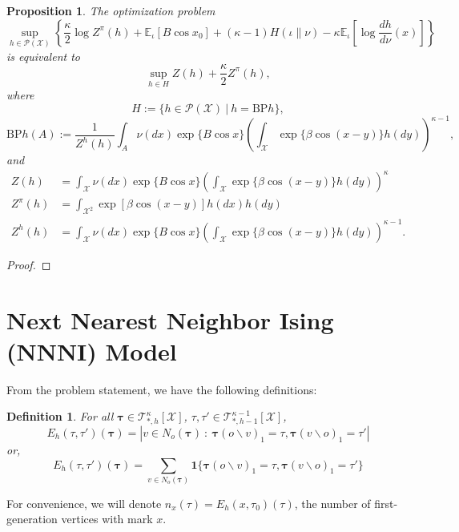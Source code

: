\documentclass[12pt]{article}
\newtheorem{proposition}[theorem]{Proposition}
\newtheorem{definition}[theorem]{Definition}
\newcommand{\TB}{{ \boldsymbol\tau}}
\numberwithin{equation}{section}
\begin{document}
\begin{proposition}
    The optimization problem
    \begin{equation*}
        \sup_{h\in\mathcal{P}(\mathcal{X})}\left\{\frac\kappa2\log Z^\pi(h) + \mathbb{E}_{\iota}\left[B\cos x_0\right] + (\kappa-1)H(\iota \| \nu)
        - \kappa\mathbb{E}_{\iota}\left[\log\frac{dh}{d\nu}(x)\right]\right\}
    \end{equation*}
    is equivalent to
    \begin{equation*}
        \sup_{h\in H} Z(h) + \frac\kappa2Z^\pi(h),
    \end{equation*}
    where
    \begin{equation*}
        H := \{h\in \mathcal{P}(\mathcal{X})\ |\ h=\text{BP}h\},
    \end{equation*}
    \begin{equation}
        \text{BP}h(A) := \frac{1}{Z^h(h)}\int_A \nu(dx)\exp\{B\cos x\}\left(\int_{\mathcal{X}}\exp\{\beta\cos(x-y)\}h(dy)\right)^{\kappa-1},
    \end{equation}
    and
    \begin{equation}
        \begin{aligned}
            Z (h)    & = \int_{\mathcal{X}} \nu(dx) \exp\{B\cos x\} \left(\int_\mathcal{X}\exp\{\beta\cos(x-y)\}h(dy)\right)^\kappa       \\
            Z^\pi(h) & = \int_{\mathcal{X}^2} \exp\left[\beta\cos(x- y)\right]h(dx)h(dy)                                                  \\
            Z^h(h)   & = \int_{\mathcal{X}} \nu(dx) \exp\{B\cos x\}\left(\int_{\mathcal{X}}\exp\{\beta\cos(x-y)\}h(dy)\right)^{\kappa-1}.
        \end{aligned}
    \end{equation}
\end{proposition}

\begin{proof}

\end{proof}


\newpage

\section{Next Nearest Neighbor Ising (NNNI) Model}

From the problem statement, we have the following definitions:
\begin{definition}
    For all $\TB\in \mathcal{T}_{*, h}^\kappa[\mathcal{X}]$, $\tau, \tau'\in \mathcal{T}_{*, h-1}^{\kappa-1}[\mathcal{X}]$,
    \begin{equation*}
        E_h(\tau, \tau')(\TB) = |v\in N_o(\TB)\ :\ \TB(o\backslash v)_1 = \tau, \TB(v\backslash o)_1 = \tau'|
    \end{equation*}
    or,
    \begin{equation*}
        E_h(\tau, \tau')(\TB) = \sum_{v\in N_o(\TB)}\mathbf{1}\{\TB(o\backslash v)_1 = \tau, \TB(v\backslash o)_1 = \tau'\}
    \end{equation*}
\end{definition}
For convenience, we will denote $n_x(\tau) = E_h(x, \tau_0)(\tau)$, the number of first-generation vertices with mark $x$.
\end{document}
